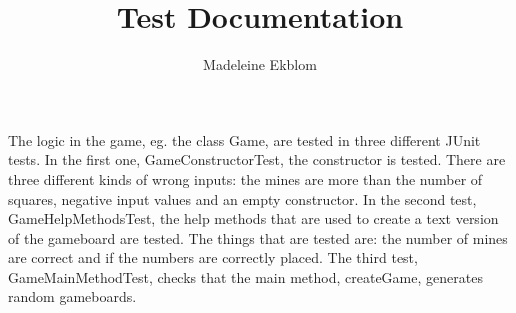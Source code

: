 \documentclass[12pt,twoside,a4paper]{article}
\title{Test Documentation}
\author{Madeleine Ekblom}
\begin{document}
\maketitle

\newpage

The logic in the game, eg. the class Game, are tested in three different JUnit tests. In the first one, GameConstructorTest, the constructor is tested. There are three different kinds of wrong inputs: the mines are more than the number of squares, negative input values and an empty constructor.
In the second test, GameHelpMethodsTest, the help methods that are used to create a text version of the gameboard are tested. The things that are tested are: the number of mines are correct and if the numbers are correctly placed.
The third test, GameMainMethodTest, checks that the main method, createGame, generates random gameboards. 
\end{document}
